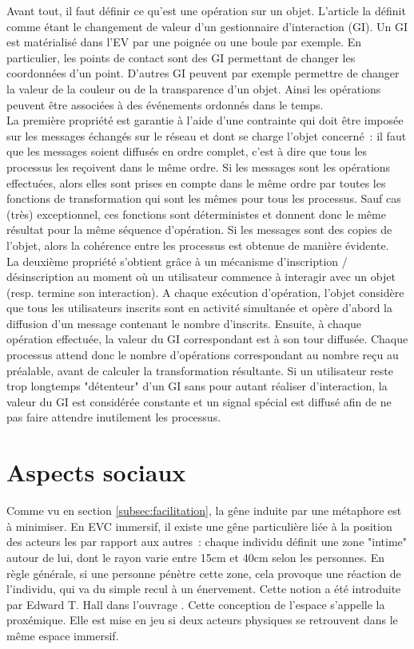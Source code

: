\documentclass[11pt]{article}
\begin{document}
Avant tout, il faut définir ce qu'est une opération sur un objet. L'article \cite{margery} la définit comme étant le changement de valeur d'un gestionnaire d'interaction (GI). Un GI est matérialisé dans l'EV par une poignée ou une boule par exemple. En particulier, les points de contact sont des GI permettant de changer les coordonnées d'un point. D'autres GI peuvent par exemple permettre de changer la valeur de la couleur ou de la transparence d'un objet. Ainsi les opérations peuvent être associées à des événements ordonnés dans le temps.
\\

La première propriété est garantie à l'aide d'une contrainte qui doit être imposée sur les messages échangés sur le réseau et dont se charge l'objet concerné~: il faut que les messages soient diffusés en ordre complet, c'est à dire que tous les processus les reçoivent dans le même ordre. Si les messages sont les opérations effectuées, alors elles sont prises en compte dans le même ordre par toutes les fonctions de transformation qui sont les mêmes pour tous les processus. Sauf cas (très) exceptionnel, ces fonctions sont déterministes et donnent donc le même résultat pour la même séquence d'opération. Si les messages sont des copies de l'objet, alors la cohérence entre les processus est obtenue de manière évidente.
\\

La deuxième propriété s'obtient grâce à un mécanisme d'inscription / désinscription au moment où un utilisateur commence à interagir avec un objet (resp. termine son interaction). A chaque exécution d'opération, l'objet considère que tous les utilisateurs inscrits sont en activité simultanée et opère d'abord la diffusion d'un message contenant le nombre d'inscrits. Ensuite, à chaque opération effectuée, la valeur du GI correspondant est à son tour diffusée. Chaque processus attend donc le nombre d'opérations correspondant au nombre reçu au préalable, avant de calculer la transformation résultante. Si un utilisateur reste trop longtemps "détenteur" d'un GI sans pour autant réaliser d'interaction, la valeur du GI est considérée constante et un signal spécial est diffusé afin de ne pas faire attendre inutilement les processus.

\section{Aspects sociaux}
\label{sec:social}

Comme vu en section \ref{subsec:facilitation}, la gêne induite par une métaphore est à minimiser. En EVC immersif, il existe une gêne particulière liée à la position des acteurs les par rapport aux autres~: chaque individu définit une zone "intime" autour de lui, dont le rayon varie entre 15cm et 40cm selon les personnes. En règle générale, si une personne pénètre cette zone, cela provoque une réaction de l'individu, qui va du simple recul à un énervement. Cette notion a été introduite par Edward T. Hall dans l'ouvrage \cite{proxemics}. Cette conception de l'espace s'appelle la proxémique. Elle est mise en jeu si deux acteurs physiques se retrouvent dans le même espace immersif.
\\
\end{document}

